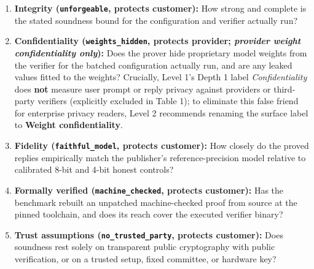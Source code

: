 \documentclass[11pt,letterpaper]{article}
\begin{document}
\begin{enumerate}
\item \textbf{Integrity (\texttt{unforgeable}, protects customer):} How strong and complete is the stated soundness bound for the configuration and verifier actually run?
\item \textbf{Confidentiality (\texttt{weights\_\allowbreak{}hidden}, protects provider; \textit{provider weight confidentiality only}):} Does the prover hide proprietary model weights from the verifier for the batched configuration actually run, and are any leaked values fitted to the weights? Crucially, Level 1's Depth 1 label \textit{Confidentiality} does \textbf{not} measure user prompt or reply privacy against providers or third-party verifiers (explicitly excluded in Table 1); to eliminate this false friend for enterprise privacy readers, Level 2 recommends renaming the surface label to \textbf{Weight confidentiality}.
\item \textbf{Fidelity (\texttt{faithful\_\allowbreak{}model}, protects customer):} How closely do the proved replies empirically match the publisher's reference-precision model relative to calibrated 8-bit and 4-bit honest controls?
\item \textbf{Formally verified (\texttt{machine\_\allowbreak{}checked}, protects customer):} Has the benchmark rebuilt an unpatched machine-checked proof from source at the pinned toolchain, and does its reach cover the executed verifier binary?
\item \textbf{Trust assumptions (\texttt{no\_\allowbreak{}trusted\_\allowbreak{}party}, protects customer):} Does soundness rest solely on transparent public cryptography with public verification, or on a trusted setup, fixed committee, or hardware key?
\end{enumerate}
\end{document}
